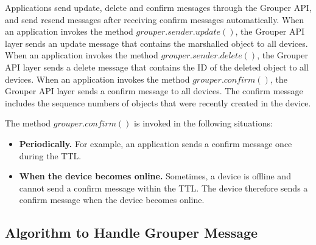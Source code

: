 \documentclass[a4paper,11pt]{report}
\begin{document}
Applications send update, delete and confirm messages through the Grouper API, and send resend messages after receiving confirm messages automatically.
When an application invokes the method $grouper.sender.update()$, the Grouper API layer sends an update message that contains the marshalled object to all devices.
When an application invokes the method $grouper.sender.delete()$, the Grouper API layer sends a delete message that contains the ID of the deleted object to all devices. 
When an application invokes the method $grouper.confirm()$, the Grouper API layer sends a confirm message to all devices. 
The confirm message includes the sequence numbers of objects that were recently created in the device.

The method $grouper.confirm()$ is invoked in the following situations:

\begin{itemize}[leftmargin=7mm]
	\setlength{\itemsep}{1pt}
	\setlength{\parskip}{0pt}
	\setlength{\parsep}{0pt}
	\item \textbf{Periodically.}
	For example, an application sends a confirm message once during the TTL.
	\item \textbf{When the device becomes online.} 
	Sometimes, a device is offline and cannot send a confirm message within the TTL.
	The device therefore sends a confirm message when the device becomes online.
\end{itemize}

\subsection{Algorithm to Handle Grouper Message}
\end{document}
